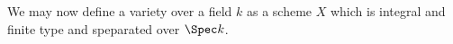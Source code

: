 We may now define a variety over a field $k$ as a scheme $X$ which is
integral and finite type and speparated over $\Spec k$.
